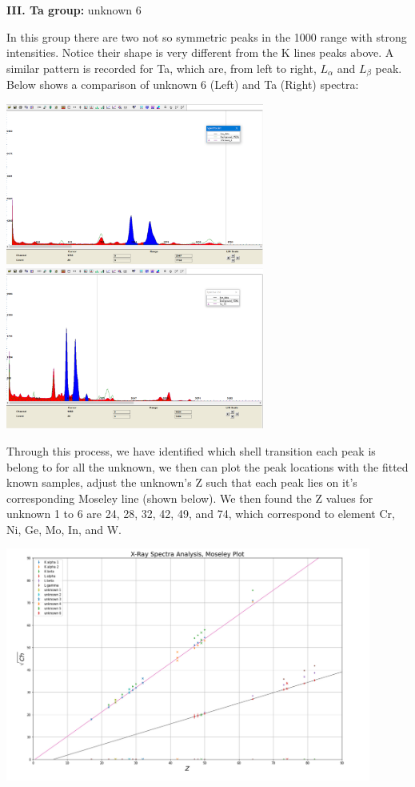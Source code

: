 \documentclass[12pt]{article}
\begin{document}
\textbf{III. Ta group:} unknown 6

In this group there are two not so symmetric peaks in the 1000 range with strong intensities. Notice their shape is very different from the K lines peaks above. A similar pattern is recorded for Ta, which are, from left to right, $L_{\alpha}$ and $L_{\beta}$ peak. Below shows a comparison of unknown 6 (Left) and Ta (Right) spectra:

\includegraphics[width=8.5cm]{U6}
\includegraphics[width=8.5cm]{Ta_73}
\smallskip

Through this process, we have identified which shell transition each peak is belong to for all the unknown, we then can plot the peak locations with the fitted known samples, adjust the unknown's Z such that each peak lies on it's corresponding Moseley line (shown below).
We then found the Z values for unknown 1 to 6 are 24, 28, 32, 42, 49, and 74, which correspond to element Cr, Ni, Ge, Mo, In, and W.

\begin{center}
\includegraphics[width=12cm]{unknowns}
\end{center}
\bigskip
\end{document}
